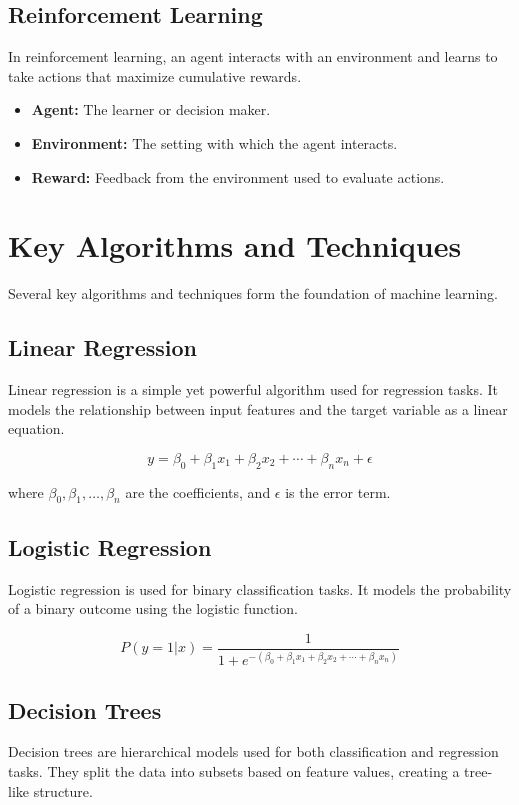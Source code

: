 \subsection{Reinforcement Learning}
In reinforcement learning, an agent interacts with an environment and learns to take actions that maximize cumulative rewards.

\begin{itemize}
    \item \textbf{Agent:} The learner or decision maker.
    \item \textbf{Environment:} The setting with which the agent interacts.
    \item \textbf{Reward:} Feedback from the environment used to evaluate actions.
\end{itemize}

\section{Key Algorithms and Techniques}
Several key algorithms and techniques form the foundation of machine learning.

\subsection{Linear Regression}
Linear regression is a simple yet powerful algorithm used for regression tasks. It models the relationship between input features and the target variable as a linear equation.

\begin{equation}
y = \beta_0 + \beta_1 x_1 + \beta_2 x_2 + \cdots + \beta_n x_n + \epsilon
\end{equation}

where \( \beta_0, \beta_1, \ldots, \beta_n \) are the coefficients, and \( \epsilon \) is the error term.

\subsection{Logistic Regression}
Logistic regression is used for binary classification tasks. It models the probability of a binary outcome using the logistic function.

\begin{equation}
P(y=1|x) = \frac{1}{1 + e^{-(\beta_0 + \beta_1 x_1 + \beta_2 x_2 + \cdots + \beta_n x_n)}}
\end{equation}

\subsection{Decision Trees}
Decision trees are hierarchical models used for both classification and regression tasks. They split the data into subsets based on feature values, creating a tree-like structure.

